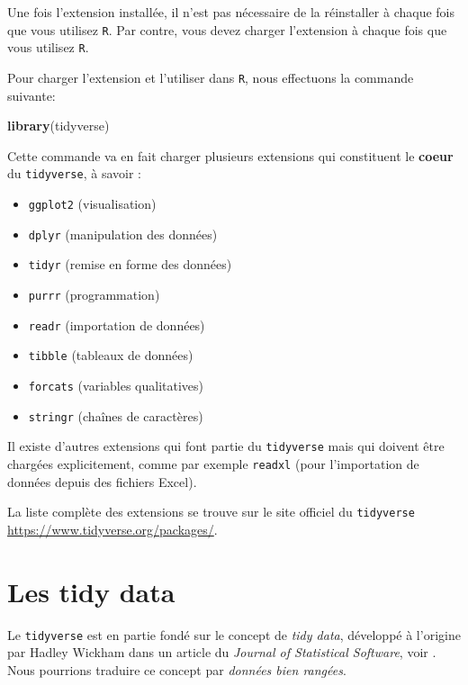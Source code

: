 \documentclass[]{book}
\newenvironment{Shaded}{\begin{snugshade}}{\end{snugshade}}
\newcommand{\KeywordTok}[1]{\textcolor[rgb]{0.13,0.29,0.53}{\textbf{#1}}}
\newcommand{\NormalTok}[1]{#1}
\providecommand{\tightlist}{%
  \setlength{\itemsep}{0pt}\setlength{\parskip}{0pt}}
\begin{document}
Une fois l'extension installée, il n'est pas nécessaire de la
réinstaller à chaque fois que vous utilisez \texttt{R}. Par contre, vous
devez charger l'extension à chaque fois que vous utilisez \texttt{R}.

Pour charger l'extension et l'utiliser dans \texttt{R}, nous effectuons
la commande suivante:

\begin{Shaded}
\begin{Highlighting}[]
\KeywordTok{library}\NormalTok{(tidyverse)}
\end{Highlighting}
\end{Shaded}

Cette commande va en fait charger plusieurs extensions qui constituent
le \textbf{coeur} du \texttt{tidyverse}, à savoir :

\begin{itemize}
\tightlist
\item
  \texttt{ggplot2} (visualisation)
\item
  \texttt{dplyr} (manipulation des données)
\item
  \texttt{tidyr} (remise en forme des données)
\item
  \texttt{purrr} (programmation)
\item
  \texttt{readr} (importation de données)
\item
  \texttt{tibble} (tableaux de données)
\item
  \texttt{forcats} (variables qualitatives)
\item
  \texttt{stringr} (chaînes de caractères)
\end{itemize}

Il existe d'autres extensions qui font partie du \texttt{tidyverse} mais
qui doivent être chargées explicitement, comme par exemple
\texttt{readxl} (pour l'importation de données depuis des fichiers
Excel).

La liste complète des extensions se trouve sur le site officiel du
\texttt{tidyverse} \url{https://www.tidyverse.org/packages/}.

\section{Les tidy data}\label{tidydata}

Le \texttt{tidyverse} est en partie fondé sur le concept de \emph{tidy
data}, développé à l'origine par Hadley Wickham dans un article du
\emph{Journal of Statistical Software}, voir \citep{wickham2014}. Nous
pourrions traduire ce concept par \emph{données bien rangées}.
\end{document}
